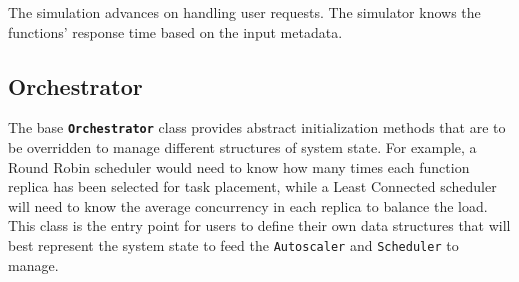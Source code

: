 
The simulation advances on handling user requests. The simulator knows the functions' response time based on the input metadata. %








\subsection{Orchestrator}

The base \textbf{\texttt{Orchestrator}} class provides abstract initialization methods that are to be overridden to manage different structures of system state. For example, a Round Robin scheduler would need to know how many times each function replica has been selected for task placement, while a Least Connected scheduler will need to know the average concurrency in each replica to balance the load. This class is the entry point for users to define their own data structures that will best represent the system state to feed the \texttt{Autoscaler} and \texttt{Scheduler} to manage.


